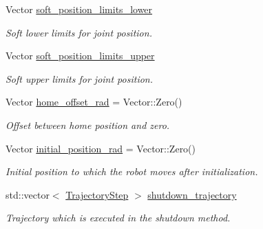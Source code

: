 \begin{DoxyCompactItemize}
Vector \hyperlink{structblmc__robots_1_1NJointBlmcRobotDriver_1_1Config_a18a496c6cf2f794930ee72f2746e223f}{soft\+\_\+position\+\_\+limits\+\_\+lower}
\begin{DoxyCompactList}\small\item\em Soft lower limits for joint position. \end{DoxyCompactList}\item 
Vector \hyperlink{structblmc__robots_1_1NJointBlmcRobotDriver_1_1Config_a06ae5378a2d4f7d19a3e8b501651bfbc}{soft\+\_\+position\+\_\+limits\+\_\+upper}
\begin{DoxyCompactList}\small\item\em Soft upper limits for joint position. \end{DoxyCompactList}\item 
\mbox{\label{structblmc__robots_1_1NJointBlmcRobotDriver_1_1Config_a432b086d9f6258c036098a75501c3dab}} 
Vector \hyperlink{structblmc__robots_1_1NJointBlmcRobotDriver_1_1Config_a432b086d9f6258c036098a75501c3dab}{home\+\_\+offset\+\_\+rad} = Vector\+::\+Zero()
\begin{DoxyCompactList}\small\item\em Offset between home position and zero. \end{DoxyCompactList}\item 
\mbox{\label{structblmc__robots_1_1NJointBlmcRobotDriver_1_1Config_a448a4d4166184f4b5f53be4ad60eec7e}} 
Vector \hyperlink{structblmc__robots_1_1NJointBlmcRobotDriver_1_1Config_a448a4d4166184f4b5f53be4ad60eec7e}{initial\+\_\+position\+\_\+rad} = Vector\+::\+Zero()
\begin{DoxyCompactList}\small\item\em Initial position to which the robot moves after initialization. \end{DoxyCompactList}\item 
std\+::vector$<$ \hyperlink{structblmc__robots_1_1NJointBlmcRobotDriver_1_1Config_1_1TrajectoryStep}{Trajectory\+Step} $>$ \hyperlink{structblmc__robots_1_1NJointBlmcRobotDriver_1_1Config_a1f241f65d2b50b3bb5b4b83837dbaae8}{shutdown\+\_\+trajectory}
\begin{DoxyCompactList}\small\item\em Trajectory which is executed in the shutdown method. \end{DoxyCompactList}\end{DoxyCompactItemize}
